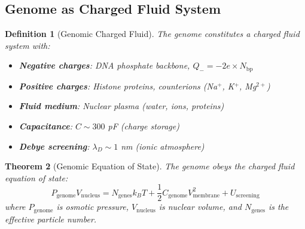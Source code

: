 \documentclass[11pt,a4paper]{article}
\newtheorem{theorem}{Theorem}[section]
\newtheorem{definition}[theorem]{Definition}
\theoremstyle{remark}
\begin{document}
\subsection{Genome as Charged Fluid System}

\begin{definition}[Genomic Charged Fluid]
\label{def:genomic_charged_fluid}
The genome constitutes a charged fluid system with:
\begin{itemize}
\item \textbf{Negative charges}: DNA phosphate backbone, $Q_- = -2e \times N_{\text{bp}}$
\item \textbf{Positive charges}: Histone proteins, counterions (Na$^+$, K$^+$, Mg$^{2+}$)
\item \textbf{Fluid medium}: Nuclear plasma (water, ions, proteins)
\item \textbf{Capacitance}: $C \sim 300$ pF (charge storage)
\item \textbf{Debye screening}: $\lambda_D \sim 1$ nm (ionic atmosphere)
\end{itemize}
\end{definition}

\begin{theorem}[Genomic Equation of State]
\label{thm:genomic_eos_charged}
The genome obeys the charged fluid equation of state:
\begin{equation}
P_{\text{genome}}V_{\text{nucleus}} = N_{\text{genes}}k_BT + \frac{1}{2}C_{\text{genome}}V_{\text{membrane}}^2 + U_{\text{screening}}
\end{equation}
where $P_{\text{genome}}$ is osmotic pressure, $V_{\text{nucleus}}$ is nuclear volume, and $N_{\text{genes}}$ is the effective particle number.
\end{theorem}
\end{document}
